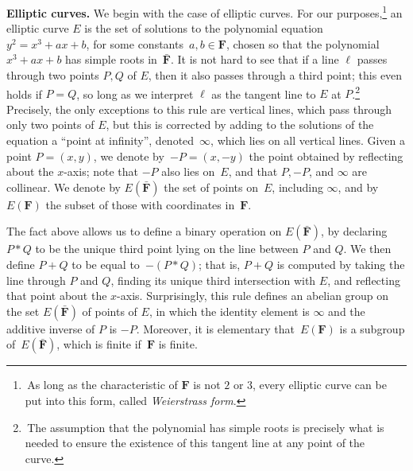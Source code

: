 \documentclass[12pt]{amsart}
\numberwithin{equation}{section}
\newcommand{\Ff}{\mathbf{F}}
\theoremstyle{plain}
\theoremstyle{remark}
\theoremstyle{definition}
\begin{document}
\textbf{Elliptic curves.}  We begin with the case of elliptic
curves. For our purposes,\footnote{\,As long as the characteristic of
  $\Ff$ is not $2$ or $3$, every elliptic curve can be put into this
  form, called \emph{Weierstrass form}.} an elliptic curve $E$ is the set of solutions to the polynomial
equation $y^2=x^3+ax+b$, for some constants~$a,b \in \Ff$, chosen so
that the polynomial $x^3+ax+b$ has simple roots in~$\bar{\Ff}$. It
is not hard to see that if a line $\ell$ passes through two points
$P,Q$ of $E$, then it also passes through a third point; this even
holds if $P=Q$, so long as we interpret $\ell$ as the tangent line to $E$ at $P$.\footnote{\,The assumption that
  the polynomial has simple roots is precisely what is needed to
  ensure the existence of this tangent line at any point of the
  curve.} Precisely, the only exceptions to this rule are vertical
lines, which pass through only two points of $E$, but this is
corrected by adding to the solutions of the equation a ``point at
infinity'', denoted~$\infty$, which lies on all vertical lines.
Given a point $P=(x,y)$, we denote by~$-P=(x,-y)$ the point obtained
by reflecting about the $x$-axis; note that $-P$ also lies on~$E$, and
that $P, -P$, and $\infty$ are collinear. We denote by $E(\bar{\Ff})$
the set of points on~$E$, including $\infty$, and by~$E(\Ff)$ the
subset of those with coordinates in~$\Ff$.

The fact above allows us to define a binary operation on
$E(\bar{\Ff})$, by declaring $P*Q$ to be the unique third point lying
on the line between $P$ and $Q$. We then define $P+Q$ to be equal
to~$-(P*Q)$; that is, $P+Q$ is computed by taking the line through $P$
and $Q$, finding its unique third intersection with $E$, and
reflecting that point about the $x$-axis. Surprisingly, this rule
defines an abelian group on the set $E(\bar{\Ff})$ of points of $E$,
in which the identity element is $\infty$ and the additive inverse of
$P$ is $-P$. Moreover, it is elementary that~$E(\Ff)$ is a subgroup of~$E(\bar{\Ff})$, which is finite if~$\Ff$ is finite.
\end{document}
